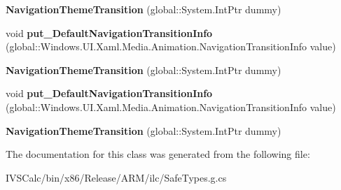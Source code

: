 \begin{DoxyCompactItemize}
{\bfseries Navigation\+Theme\+Transition} (global\+::\+System.\+Int\+Ptr dummy)
\item 
\mbox{\label{class_windows_1_1_u_i_1_1_xaml_1_1_media_1_1_animation_1_1_navigation_theme_transition_af07401c9d907aa1083ec63864735318d}} 
void {\bfseries put\+\_\+\+Default\+Navigation\+Transition\+Info} (global\+::\+Windows.\+U\+I.\+Xaml.\+Media.\+Animation.\+Navigation\+Transition\+Info value)
\item 
\mbox{\label{class_windows_1_1_u_i_1_1_xaml_1_1_media_1_1_animation_1_1_navigation_theme_transition_a955f8702deb50586245db661ab015571}} 
{\bfseries Navigation\+Theme\+Transition} (global\+::\+System.\+Int\+Ptr dummy)
\item 
\mbox{\label{class_windows_1_1_u_i_1_1_xaml_1_1_media_1_1_animation_1_1_navigation_theme_transition_af07401c9d907aa1083ec63864735318d}} 
void {\bfseries put\+\_\+\+Default\+Navigation\+Transition\+Info} (global\+::\+Windows.\+U\+I.\+Xaml.\+Media.\+Animation.\+Navigation\+Transition\+Info value)
\item 
\mbox{\label{class_windows_1_1_u_i_1_1_xaml_1_1_media_1_1_animation_1_1_navigation_theme_transition_a955f8702deb50586245db661ab015571}} 
{\bfseries Navigation\+Theme\+Transition} (global\+::\+System.\+Int\+Ptr dummy)
\end{DoxyCompactItemize}


The documentation for this class was generated from the following file\+:\begin{DoxyCompactItemize}
\item 
I\+V\+S\+Calc/bin/x86/\+Release/\+A\+R\+M/ilc/Safe\+Types.\+g.\+cs\end{DoxyCompactItemize}
